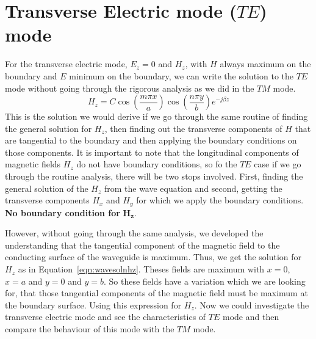 \section{Transverse Electric mode ($TE$) mode}
For the transverse electric mode, $E_{z} = 0$ and $H_{z}$, with $H$ always maximum on the boundary and $E$ minimum on the boundary, we can write the solution to the $TE$ mode without going through the rigorous analysis as we did in the $TM$ mode.
\begin{equation}
H_z = C\cos\left(\frac{m\pi x}{a}\right) \cos\left(\frac{n\pi y}{b}\right)e^{-j\beta z}
\label{eqn:wavesolnhz}
\end{equation}
This is the solution we would derive if we go through the same routine of finding the general solution for $H_z$, then finding out the transverse components of $H$ that are tangential to the boundary and then applying the boundary conditions on those components. It is important to note that the longitudinal components of magnetic fields $H_z$ do not have boundary conditions, so fo the $TE$ case if we go through the routine analysis, there will be two stops involved. First, finding the general solution of the $H_z$ from the wave equation and second, getting the transverse components $H_x$ and $H_y$ for which we apply the boundary conditions. \textbf{No boundary condition for} $\boldsymbol{H_z}$.

However, without going through the same analysis, we developed the understanding that the tangential component of the magnetic field to the conducting surface of the waveguide is maximum. Thus, we get the solution for $H_z$ as in Equation~\eqref{eqn:wavesolnhz}. Theses fields are maximum with $x=0$, $x=a$ and $y=0$ and $y=b$. So these fields have a variation which we are looking for, that those tangential components of the magnetic field must be maximum at the boundary surface. Using this expression for $H_z$. Now we could investigate the transverse electric mode and see the characteristics of $TE$ mode and then compare the behaviour of this mode with the $TM$ mode.

